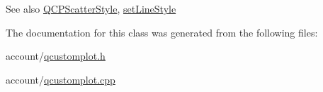 \begin{DoxySeeAlso}{\-See also}
\hyperlink{classQCPScatterStyle}{\-Q\-C\-P\-Scatter\-Style}, \hyperlink{classQCPCurve_a4a377ec863ff81a1875c3094a6177c19}{set\-Line\-Style} 
\end{DoxySeeAlso}


\-The documentation for this class was generated from the following files\-:\begin{DoxyCompactItemize}
\item 
account/\hyperlink{qcustomplot_8h}{qcustomplot.\-h}\item 
account/\hyperlink{qcustomplot_8cpp}{qcustomplot.\-cpp}\end{DoxyCompactItemize}
